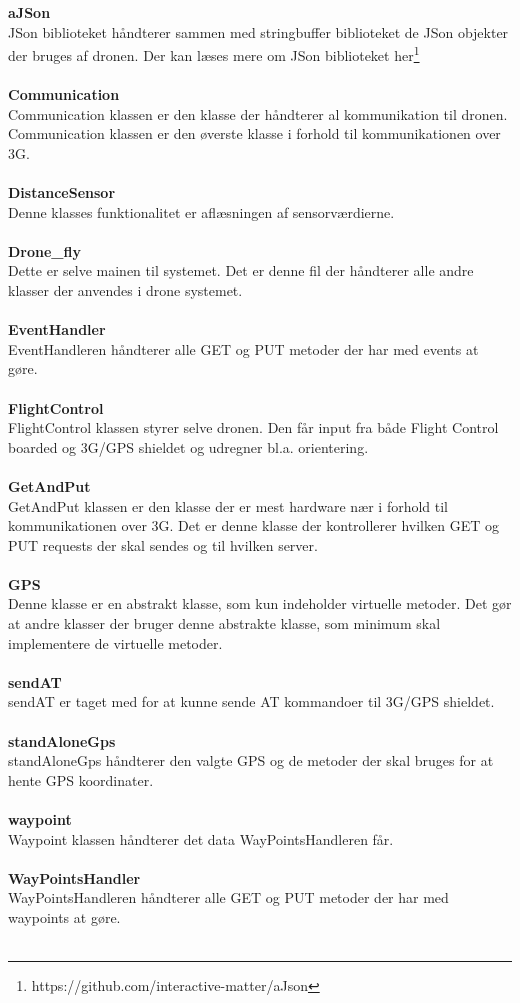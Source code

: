 \textbf{aJSon}\\
JSon biblioteket håndterer sammen med stringbuffer biblioteket de JSon objekter der bruges af dronen. Der kan læses mere om JSon biblioteket her\footnote{https://github.com/interactive-matter/aJson} \\ \\
\textbf{Communication}\\
Communication klassen er den klasse der håndterer al kommunikation til dronen. Communication klassen er den øverste klasse i forhold til kommunikationen over 3G. \\ \\
\textbf{DistanceSensor}\\
Denne klasses funktionalitet er aflæsningen af sensorværdierne. \\ \\
\textbf{Drone\_fly}\\
Dette er selve mainen til systemet. Det er denne fil der håndterer alle andre klasser der anvendes i drone systemet. \\ \\
\textbf{EventHandler}\\
EventHandleren håndterer alle GET og PUT metoder der har med events at gøre. \\ \\
\textbf{FlightControl}\\
FlightControl klassen styrer selve dronen. Den får input fra både Flight Control boarded og 3G/GPS shieldet og udregner bl.a. orientering. \\ \\
\textbf{GetAndPut}\\
GetAndPut klassen er den klasse der er mest hardware nær i forhold til kommunikationen over 3G. Det er denne klasse der kontrollerer hvilken GET og PUT requests der skal sendes og til hvilken server. \\ \\ 
\textbf{GPS}\\
Denne klasse er en abstrakt klasse, som kun indeholder virtuelle metoder. Det gør at andre klasser der bruger denne abstrakte klasse, som minimum skal implementere de virtuelle metoder. \\ \\
\textbf{sendAT}\\
sendAT er taget med for at kunne sende AT kommandoer til 3G/GPS shieldet. \\ \\
\textbf{standAloneGps}\\
standAloneGps håndterer den valgte GPS og de metoder der skal bruges for at hente GPS koordinater. \\ \\
\textbf{waypoint}\\
Waypoint klassen håndterer det data WayPointsHandleren får.\\ \\
\textbf{WayPointsHandler}\\
WayPointsHandleren håndterer alle GET og PUT metoder der har med  waypoints at gøre. \\ \\





